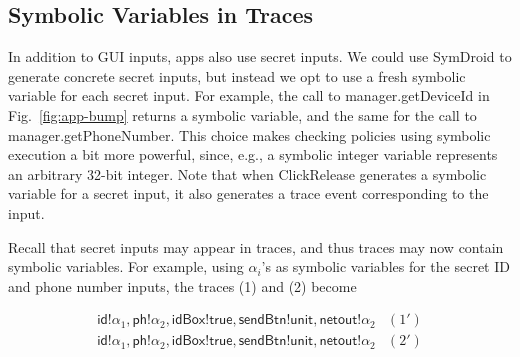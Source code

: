 \documentclass{llncs}
\newcommand{\code}[1]{\textsf{#1}} %
\newcommand{\toolname}{ClickRelease\xspace}
\begin{document}
\subsection{Symbolic Variables in Traces}
\label{sec:symbolic-traces}



In addition to GUI inputs, apps also use secret inputs. We could use
SymDroid to generate concrete secret inputs, but instead we opt to use
a fresh symbolic variable for each secret input. For example, the call
to \code{manager.getDeviceId} in Fig.~\ref{fig:app-bump} returns a
symbolic variable, and the same for the call to
\code{manager.getPhoneNumber}. This choice makes checking policies
using symbolic execution a bit more powerful, since, e.g., a symbolic
integer variable represents an arbitrary 32-bit integer. Note that
when \toolname generates a symbolic variable for a secret input, it
also generates a trace event corresponding to the input.

Recall that secret inputs may appear in traces, and thus traces may
now contain symbolic variables. For example, using $\alpha_i$'s as
symbolic variables for the secret ID and phone number inputs, the
traces (1) and (2) become

\begin{displaymath}
  \begin{array}{cl}
    \code{id}!\alpha_1, \code{ph}!\alpha_2, \code{idBox}!\code{true},
    \code{sendBtn}!\code{unit}, \code{netout}!\alpha_2 & (1') \\
    \code{id}!\alpha_1, \code{ph}!\alpha_2, \code{idBox}!\code{true},
    \code{sendBtn}!\code{unit}, \code{netout}!\alpha_2 & (2') \\
  \end{array}
\end{displaymath}
\end{document}
